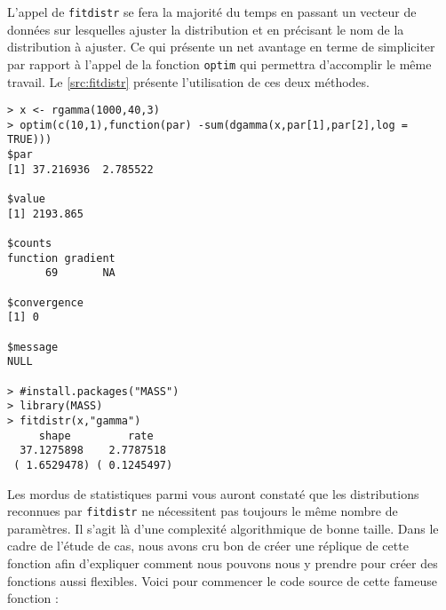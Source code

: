 L'appel de \texttt{fitdistr} se fera la majorité du temps en passant un vecteur de données sur lesquelles ajuster la distribution et en précisant le nom de la distribution à ajuster. Ce qui présente un net avantage en terme de simpliciter par rapport à l'appel de la fonction \texttt{optim} qui permettra d'accomplir le même travail. Le \autoref{src:fitdistr} présente l'utilisation de ces deux méthodes. \\

\begin{lstlisting}[caption = Ajustement de distribution sur données empiriques,label=src:fitdistr]
> x <- rgamma(1000,40,3)
> optim(c(10,1),function(par) -sum(dgamma(x,par[1],par[2],log = TRUE)))
$par
[1] 37.216936  2.785522

$value
[1] 2193.865

$counts
function gradient 
      69       NA 

$convergence
[1] 0

$message
NULL

> #install.packages("MASS")
> library(MASS)
> fitdistr(x,"gamma")
     shape         rate   
  37.1275898    2.7787518 
 ( 1.6529478) ( 0.1245497)
\end{lstlisting}

Les mordus de statistiques parmi vous auront constaté que les distributions reconnues par \texttt{fitdistr} ne nécessitent pas toujours le même nombre de paramètres. Il s'agit là d'une complexité algorithmique de bonne taille. Dans le cadre de l'étude de cas, nous avons cru bon de créer une réplique de cette fonction afin d'expliquer comment nous pouvons nous y prendre pour créer des fonctions aussi flexibles. Voici pour commencer le code source de cette fameuse fonction : \\

